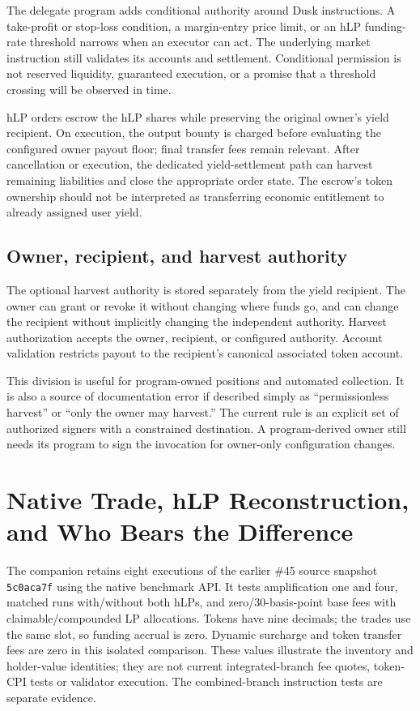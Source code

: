 The delegate program adds conditional authority around Dusk instructions. A take-profit or stop-loss condition, a margin-entry price limit, or an hLP funding-rate threshold narrows when an executor can act. The underlying market instruction still validates its accounts and settlement. Conditional permission is not reserved liquidity, guaranteed execution, or a promise that a threshold crossing will be observed in time.

hLP orders escrow the hLP shares while preserving the original owner's yield recipient. On execution, the output bounty is charged before evaluating the configured owner payout floor; final transfer fees remain relevant. After cancellation or execution, the dedicated yield-settlement path can harvest remaining liabilities and close the appropriate order state. The escrow's token ownership should not be interpreted as transferring economic entitlement to already assigned user yield.

\subsection{Owner, recipient, and harvest authority}

The optional harvest authority is stored separately from the yield recipient. The owner can grant or revoke it without changing where funds go, and can change the recipient without implicitly changing the independent authority. Harvest authorization accepts the owner, recipient, or configured authority. Account validation restricts payout to the recipient's canonical associated token account.

This division is useful for program-owned positions and automated collection. It is also a source of documentation error if described simply as ``permissionless harvest'' or ``only the owner may harvest.'' The current rule is an explicit set of authorized signers with a constrained destination. A program-derived owner still needs its program to sign the invocation for owner-only configuration changes.

\section{Native Trade, hLP Reconstruction, and Who Bears the Difference}
\label{app:native-hlp}

The companion  retains eight executions of the earlier \#45 source snapshot \texttt{5c0aca7f} using the native benchmark API. It tests amplification one and four, matched runs with/without both hLPs, and zero/30-basis-point base fees with claimable/compounded LP allocations. Tokens have nine decimals; the trades use the same slot, so funding accrual is zero. Dynamic surcharge and token transfer fees are zero in this isolated comparison. These values illustrate the inventory and holder-value identities; they are not current integrated-branch fee quotes, token-CPI tests or validator execution. The combined-branch instruction tests are separate evidence.

